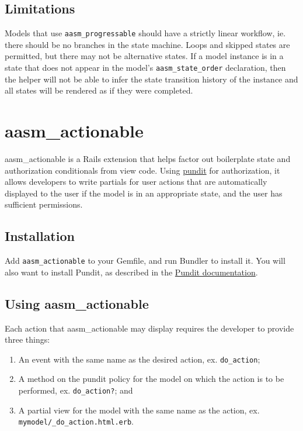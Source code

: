 \documentclass[document.tex]{subfiles}
\begin{document}
\subsection{Limitations}

Models that use {\tt aasm\_progressable} should have a strictly linear workflow, ie. there should be no branches in the state machine. Loops and skipped states are permitted, but there may not be alternative states. If a model instance is in a state that does not appear in the model's {\tt aasm\_state\_order} declaration, then the helper will not be able to infer the state transition history of the instance and all states will be rendered as if they were completed.


\section{aasm\_actionable}

aasm\_actionable is a Rails extension that helps factor out boilerplate state and authorization conditionals from view code. Using \href{https://github.com/elabs/pundit}{pundit} for authorization, it allows developers to write partials for user actions that are automatically displayed to the user if the model is in an appropriate state, and the user has sufficient permissions.

\subsection{Installation}

Add {\tt aasm\_actionable} to your Gemfile, and run Bundler to install it. You will also want to install Pundit, as described in the \href{https://github.com/elabs/pundit\#installation}{Pundit documentation}.

\subsection{Using aasm\_actionable}

Each action that aasm\_actionable may display requires the developer to provide three things:

\begin{enumerate}
\item An event with the same name as the desired action, ex. {\tt do\_action};
\item A method on the pundit policy for the model on which the action is to be performed, ex. {\tt do\_action?}; and
\item A partial view for the model with the same name as the action, ex. \\ {\tt mymodel/\_do\_action.html.erb}.
\end{enumerate}
\end{document}
